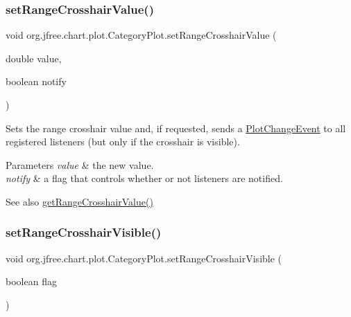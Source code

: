 \subsubsection{\texorpdfstring{set\+Range\+Crosshair\+Value()}{setRangeCrosshairValue()}\hspace{0.1cm}{\footnotesize\ttfamily [2/2]}}
{\footnotesize\ttfamily void org.\+jfree.\+chart.\+plot.\+Category\+Plot.\+set\+Range\+Crosshair\+Value (\begin{DoxyParamCaption}\item[{double}]{value,  }\item[{boolean}]{notify }\end{DoxyParamCaption})}

Sets the range crosshair value and, if requested, sends a \mbox{\hyperlink{}{Plot\+Change\+Event}} to all registered listeners (but only if the crosshair is visible).


\begin{DoxyParams}{Parameters}
{\em value} & the new value. \\
\hline
{\em notify} & a flag that controls whether or not listeners are notified.\\
\hline
\end{DoxyParams}
\begin{DoxySeeAlso}{See also}
\mbox{\hyperlink{classorg_1_1jfree_1_1chart_1_1plot_1_1_category_plot_a01074b7b04854fda802e06bb5418671b}{get\+Range\+Crosshair\+Value()}} 
\end{DoxySeeAlso}
\mbox{\label{classorg_1_1jfree_1_1chart_1_1plot_1_1_category_plot_a885d7f1c76a50bbd6c131e014fe917a5}} 
\subsubsection{\texorpdfstring{set\+Range\+Crosshair\+Visible()}{setRangeCrosshairVisible()}}
{\footnotesize\ttfamily void org.\+jfree.\+chart.\+plot.\+Category\+Plot.\+set\+Range\+Crosshair\+Visible (\begin{DoxyParamCaption}\item[{boolean}]{flag }\end{DoxyParamCaption})}

